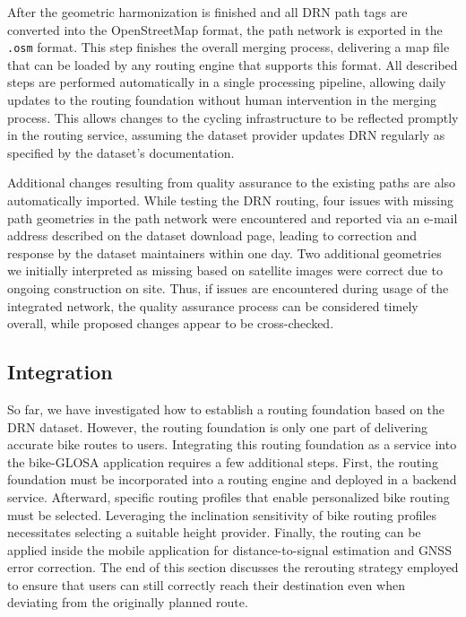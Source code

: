 After the geometric harmonization is finished and all DRN path tags are converted into the OpenStreetMap format, the path network is exported in the \texttt{.osm} format. This step finishes the overall merging process, delivering a map file that can be loaded by any routing engine that supports this format. All described steps are performed automatically in a single processing pipeline, allowing daily updates to the routing foundation without human intervention in the merging process. This allows changes to the cycling infrastructure to be reflected promptly in the routing service, assuming the dataset provider updates DRN regularly as specified by the dataset's documentation. 

Additional changes resulting from quality assurance to the existing paths are also automatically imported. While testing the DRN routing, four issues with missing path geometries in the path network were encountered and reported via an e-mail address described on the dataset download page, leading to correction and response by the dataset maintainers within one day. Two additional geometries we initially interpreted as missing based on satellite images were correct due to ongoing construction on site. Thus, if issues are encountered during usage of the integrated network, the quality assurance process can be considered timely overall, while proposed changes appear to be cross-checked.

\subsection{Integration}

So far, we have investigated how to establish a routing foundation based on the DRN dataset. However, the routing foundation is only one part of delivering accurate bike routes to users. Integrating this routing foundation as a service into the bike-GLOSA application requires a few additional steps. First, the routing foundation must be incorporated into a routing engine and deployed in a backend service. Afterward, specific routing profiles that enable personalized bike routing must be selected. Leveraging the inclination sensitivity of bike routing profiles necessitates selecting a suitable height provider. Finally, the routing can be applied inside the mobile application for distance-to-signal estimation and GNSS error correction. The end of this section discusses the rerouting strategy employed to ensure that users can still correctly reach their destination even when deviating from the originally planned route.

